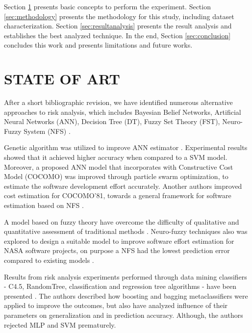 \documentclass[a4paper,twoside]{article}
\begin{document}
Section \ref{sec:stateofart} presents basic concepts to perform the experiment. Section \ref{sec:methodology} presents the methodology for this study, including dataset characterization. Section \ref{sec:resultanalysis} presents the result analysis and establishes the best analyzed technique. In the end, Section \ref{sec:conclusion} concludes this work and presents limitations and future works.

\section{\uppercase{State of Art}}
\label{sec:stateofart}

\noindent After a short bibliographic revision, we have identified numerous alternative approaches to risk analysis, which includes Bayesian Belief Networks, Artificial Neural Networks (ANN), Decision Tree (DT), Fuzzy Set Theory (FST), Neuro-Fuzzy System (NFS) \cite{huang2004neuro} \cite{hu2007software} \cite{attarzadeh2010novel} \cite{dzega2010classification} \cite{yu2011software} \cite{saxena2012software} \cite{dan2013improving}.

Genetic algorithm was utilized to improve ANN estimator \cite{hu2007software}. Experimental results showed that it achieved higher accuracy when compared to a SVM model. Moreover, a proposed ANN model that incorporates with Constructive Cost Model (COCOMO) was improved through particle swarm optimization, to estimate the software development effort accurately. Another authors improved cost estimation for COCOMO'81, towards a general framework for software estimation based on NFS \cite{huang2004neuro}.

A model based on fuzzy theory have overcome the difficulty of qualitative and quantitative assessment of traditional methods \cite{yu2011software}. Neuro-fuzzy techniques also was explored to design a suitable model to improve software effort estimation for NASA software projects, on purpose a NFS had the lowest prediction error compared to existing models \cite{saxena2012software}.

Results from risk analysis experiments performed through data mining classifiers - C4.5, RandomTree, classification and regression tree algorithms - have been presented \cite{dzega2010classification}. The authors described how boosting and bagging metaclassifiers were applied to improve the outcomes, but also have analyzed influence of their parameters on generalization and in prediction accuracy. Although, the authors rejected MLP and SVM prematurely.
\end{document}
